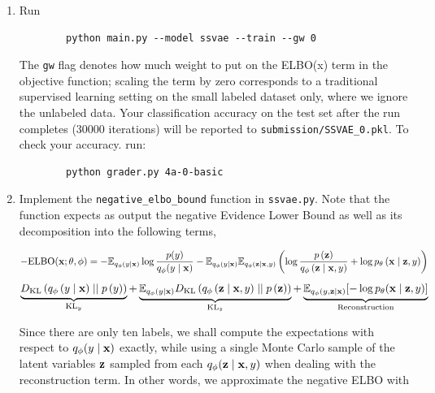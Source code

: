 \begin{enumerate}[label=(\alph*)]
    \item {} Run 
    \begin{verbatim}
        python main.py --model ssvae --train --gw 0
    \end{verbatim}

    The \texttt{gw} flag denotes how much weight to put on the ELBO(x) 
    term in the objective function; scaling the term by zero corresponds to a traditional supervised learning setting 
    on the small labeled dataset only, where we ignore the unlabeled data. Your classification accuracy on the 
    test set after the run completes (30000 iterations) will be reported to \texttt{submission/SSVAE\_0.pkl}. To
    check your accuracy. run:

    \begin{verbatim}
        python grader.py 4a-0-basic
    \end{verbatim}

    \item  {} Implement the \texttt{negative\_elbo\_bound} function in \texttt{ssvae.py}. Note that the function expects
    as output the negative Evidence Lower Bound as well as its decomposition into the following terms,

    \begin{equation} \label{eq:28}
        - \text{ELBO}(\mathbf{x};\theta,\phi) = - \mathbb{E}_{q_{\phi}(y \mid \mathbf{x})} \log \frac{p(y)}{q_{\phi}(y \mid \mathbf{x})} - \mathbb{E}_{q_{\phi}(y \mid \mathbf{x})}\mathbb{E}_{q_{\phi}(\mathbf{z} \mid \mathbf{x}, y)}\left(\log \frac{p\left(\mathbf{z}\right)}{q_{\phi}\left(\mathbf{z} \mid \mathbf{x}, y\right)} + \log p_{\theta}\left(\mathbf{x} \mid \mathbf{z}, y\right)\right)
    \end{equation}
    \begin{equation} \label{eq:29}
        \underbrace{D_{\text{KL}}\left(q_{\phi}\left(y \mid \mathbf{x}\right) \mid\mid p\left(y\right)\right)}_{\text{KL}_y} + \underbrace{\mathbb{E}_{q_{\phi}(y\mid\mathbf{x})}D_{\text{KL}}\left(q_{\phi}\left(\mathbf{z} \mid \mathbf{x}, y\right) \mid\mid p\left(\mathbf{z}\right)\right)}_{\text{KL}_z} + \underbrace{\mathbb{E}_{q_{\phi}(y,\mathbf{z} \mid \mathbf{x})} [- \log p_{\theta}(\mathbf{x} \mid \mathbf{z}, y)]}_\text{Reconstruction}
    \end{equation}

    Since there are only ten labels, we shall compute the expectations with respect to $q_{\phi}(y \mid \mathbf{x})$ exactly, while 
    using a single Monte Carlo sample of the latent variables $\mathbf{z}$ sampled from each $q_{\phi}(\mathbf{z} \mid \mathbf{x},y)$ when dealing 
    with the reconstruction term. In other words, we approximate the negative ELBO with


\end{enumerate}
